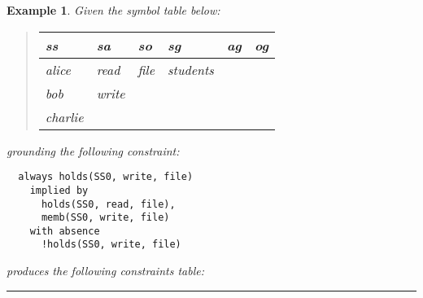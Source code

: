 \documentclass[10pt, twocolumn]{article}
\newtheorem{examp}{Example}
\newenvironment{example}{\begin{examp}\rm}{\rule{2mm}{2mm}\end{examp}}
\begin{document}
        \begin{example}
          Given the symbol table below:

          \begin{quote}
            \begin{tabular}[t]{|l|l|l|l|l|l|}
              \hline
              \textbf{ss} & \textbf{sa} & \textbf{so} & \textbf{sg} & \textbf{ag} & \textbf{og} \\
              \hline
              alice & read & file & students & & \\
              bob & write & & & & \\
              charlie & & & & & \\
              \hline
            \end{tabular}
          \end{quote}

          grounding the following constraint:

          \begin{verbatim}
  always holds(SS0, write, file)
    implied by
      holds(SS0, read, file),
      memb(SS0, write, file)
    with absence
      !holds(SS0, write, file)
          \end{verbatim}

          produces the following constraints table:


\end{example}
\end{document}
